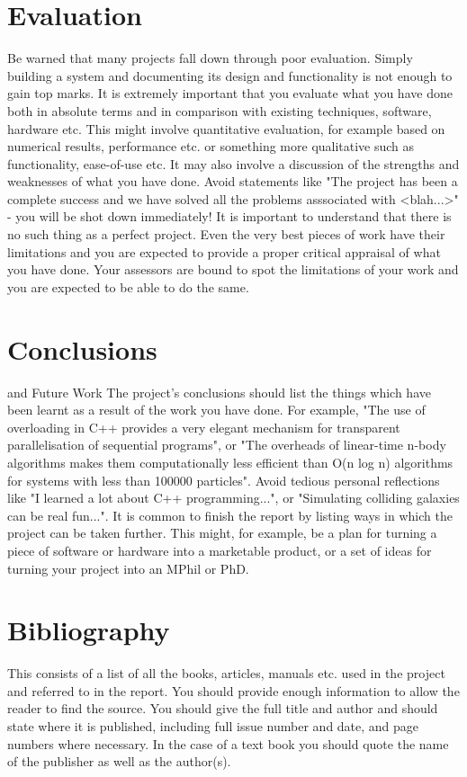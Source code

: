 \documentclass{report}
\begin{document}
\section{Evaluation} 
Be warned that many projects fall down through poor evaluation. Simply building a system and documenting its design and functionality is not enough to gain top marks. It is extremely important that you evaluate what you have done both in absolute terms and in comparison with existing techniques, software, hardware etc. This might involve quantitative evaluation, for example based on numerical results, performance etc. or something more qualitative such as functionality, ease-of-use etc. It may also involve a discussion of the strengths and weaknesses of what you have done. Avoid statements like "The project has been a complete success and we have solved all the problems asssociated with <blah...>" - you will be shot down immediately! It is important to understand that there is no such thing as a perfect project. Even the very best pieces of work have their limitations and you are expected to provide a proper critical appraisal of what you have done. Your assessors are bound to spot the limitations of your work and you are expected to be able to do the same. 

\section{Conclusions} 
and Future Work The project's conclusions should list the things which have been learnt as a result of the work you have done. For example, "The use of overloading in C++ provides a very elegant mechanism for transparent parallelisation of sequential programs", or "The overheads of linear-time n-body algorithms makes them computationally less efficient than O(n log n) algorithms for systems with less than 100000 particles". Avoid tedious personal reflections like "I learned a lot about C++ programming...", or "Simulating colliding galaxies can be real fun...". It is common to finish the report by listing ways in which the project can be taken further. This might, for example, be a plan for turning a piece of software or hardware into a marketable product, or a set of ideas for turning your project into an MPhil or PhD. 

\section{Bibliography} 
This consists of a list of all the books, articles, manuals etc. used in the project and referred to in the report. You should provide enough information to allow the reader to find the source. You should give the full title and author and should state where it is published, including full issue number and date, and page numbers where necessary. In the case of a text book you should quote the name of the publisher as well as the author(s). 
\end{document}
